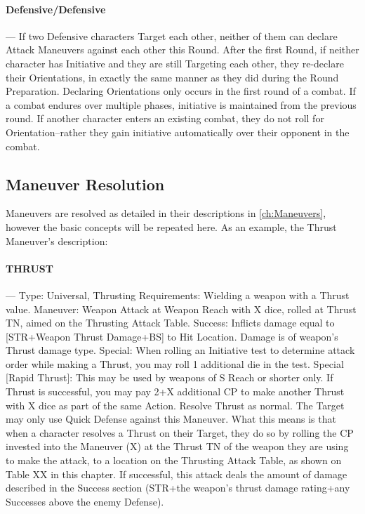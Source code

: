 \documentclass[oneside,11pt,english]{book}
\begin{document}
\paragraph{\label{par:Defensive/Defensive}Defensive/Defensive}---\quad
If two Defensive characters Target each other, neither of them can declare Attack Maneuvers
against each other this Round. After the first Round, if neither character has Initiative and they
are still Targeting each other, they re-declare their Orientations, in exactly the same manner as
they did during the Round Preparation.
Declaring Orientations only occurs in the first round of a combat. If a combat endures over multiple
phases, initiative is maintained from the previous round. If another character enters an existing combat,
they do not roll for Orientation--rather they gain initiative automatically over their opponent in the
combat.

\subsection{Maneuver Resolution}
Maneuvers are resolved as detailed in their descriptions in \autoref{ch:Maneuvers}, however the basic concepts will
be repeated here.
As an example, the Thrust Maneuver’s description:
\paragraph{\large THRUST}---\quad{\large[X]}
Type: Universal, Thrusting
Requirements: Wielding a weapon with a Thrust value.
Maneuver: Weapon Attack at Weapon Reach with X dice, rolled at Thrust TN, aimed on the
Thrusting Attack Table.
Success: Inflicts damage equal to [STR+Weapon Thrust Damage+BS] to Hit Location. Damage
is of weapon’s Thrust damage type.
Special: When rolling an Initiative test to determine attack order while making a Thrust, you may
roll 1 additional die in the test.
Special [Rapid Thrust]: This may be used by weapons of S Reach or shorter only. If Thrust is
successful, you may pay 2+X additional CP to make another Thrust with X dice as part of the
same Action. Resolve Thrust as normal. The Target may only use Quick Defense against this
Maneuver.
What this means is that when a character resolves a Thrust on their Target, they do so by rolling the CP
invested into the Maneuver (X) at the Thrust TN of the weapon they are using to make the attack, to a
location on the Thrusting Attack Table, as shown on Table XX in this chapter. If successful, this attack
deals the amount of damage described in the Success section (STR+the weapon’s thrust damage
rating+any Successes above the enemy Defense).
\end{document}
